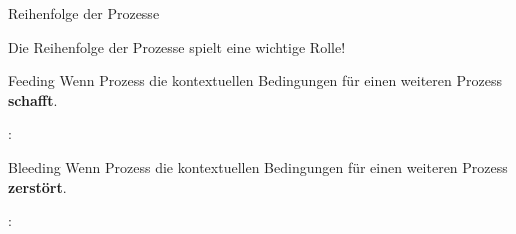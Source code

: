 \begin{frame}{Reihenfolge der Prozesse}

Die Reihenfolge der Prozesse spielt eine wichtige Rolle!

	\begin{block}{Feeding}
	Wenn Prozess die kontextuellen Bedingungen für einen weiteren Prozess \textbf{schafft}.	

	\end{block}

	\ea {}:  \ras {} \ras {}
	\z

	\begin{block}{Bleeding}
	Wenn Prozess die kontextuellen Bedingungen für einen weiteren Prozess \textbf{zerstört}.
	\end{block}

	\ea {}:  \ras {} \ras \textipa{[g@.zaN]} \alertblue{$\nrightarrow$} 
	\z
	

\end{frame}



